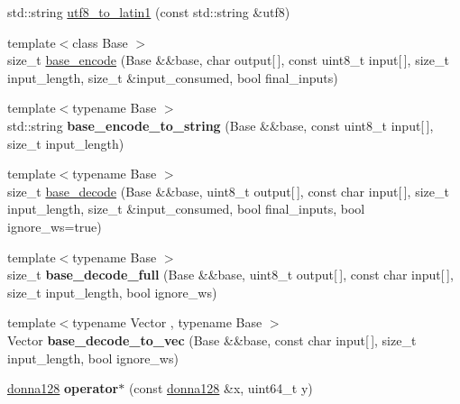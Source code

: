 \begin{DoxyCompactItemize}
\item 
std\+::string \mbox{\hyperlink{namespace_botan_a590c935190a5568639820d98a911f7cd}{utf8\+\_\+to\+\_\+latin1}} (const std\+::string \&utf8)
\item 
{\footnotesize template$<$class Base $>$ }\\size\+\_\+t \mbox{\hyperlink{namespace_botan_a8a4a5ffdca168ee94c08a5b20de0065a}{base\+\_\+encode}} (Base \&\&base, char output\mbox{[}$\,$\mbox{]}, const uint8\+\_\+t input\mbox{[}$\,$\mbox{]}, size\+\_\+t input\+\_\+length, size\+\_\+t \&input\+\_\+consumed, bool final\+\_\+inputs)
\item 
\mbox{\label{namespace_botan_abb9ed5028ed938ee4d8f6929c91e157a}} 
{\footnotesize template$<$typename Base $>$ }\\std\+::string {\bfseries base\+\_\+encode\+\_\+to\+\_\+string} (Base \&\&base, const uint8\+\_\+t input\mbox{[}$\,$\mbox{]}, size\+\_\+t input\+\_\+length)
\item 
{\footnotesize template$<$typename Base $>$ }\\size\+\_\+t \mbox{\hyperlink{namespace_botan_ab1d8df562b6507ed384c0f214f9b6a07}{base\+\_\+decode}} (Base \&\&base, uint8\+\_\+t output\mbox{[}$\,$\mbox{]}, const char input\mbox{[}$\,$\mbox{]}, size\+\_\+t input\+\_\+length, size\+\_\+t \&input\+\_\+consumed, bool final\+\_\+inputs, bool ignore\+\_\+ws=true)
\item 
\mbox{\label{namespace_botan_afaf80d42ee926400476065a190891bc7}} 
{\footnotesize template$<$typename Base $>$ }\\size\+\_\+t {\bfseries base\+\_\+decode\+\_\+full} (Base \&\&base, uint8\+\_\+t output\mbox{[}$\,$\mbox{]}, const char input\mbox{[}$\,$\mbox{]}, size\+\_\+t input\+\_\+length, bool ignore\+\_\+ws)
\item 
\mbox{\label{namespace_botan_a5ffb0eed609e7a4c573647072bf77e3e}} 
{\footnotesize template$<$typename Vector , typename Base $>$ }\\Vector {\bfseries base\+\_\+decode\+\_\+to\+\_\+vec} (Base \&\&base, const char input\mbox{[}$\,$\mbox{]}, size\+\_\+t input\+\_\+length, bool ignore\+\_\+ws)
\item 
\mbox{\label{namespace_botan_aae5a27e7efae7fee0144272c85a85cff}} 
\mbox{\hyperlink{class_botan_1_1donna128}{donna128}} {\bfseries operator$\ast$} (const \mbox{\hyperlink{class_botan_1_1donna128}{donna128}} \&x, uint64\+\_\+t y)

\end{DoxyCompactItemize}
